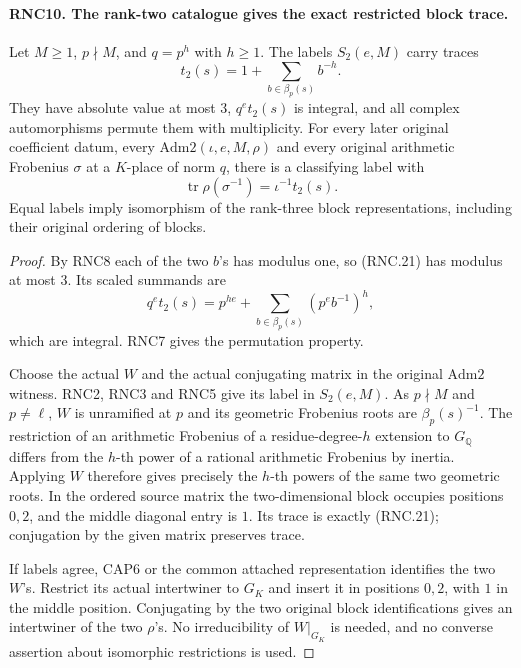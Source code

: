 \paragraph{RNC10. The rank-two catalogue gives the exact restricted block trace.}
\label{claim:RNC10}
Let $M\geq1$, $p\nmid M$, and $q=p^h$ with $h\geq1$.
The labels $S_2(e,M)$ carry traces
\[
                  t_2(s)=1+\sum_{b\in\beta_p(s)}b^{-h}.
                                                               \tag{RNC.21}
\]
They have absolute value at most $3$, $q^e t_2(s)$ is
integral, and all complex automorphisms permute them with
multiplicity.  For every later original coefficient datum,
every $\mathrm{Adm2}(\iota,e,M,\rho)$ and every original
arithmetic Frobenius $\sigma$ at a $K$-place of norm $q$,
there is a classifying label with
\[
         \operatorname{tr}\rho(\sigma^{-1})=\iota^{-1}t_2(s).
                                                               \tag{RNC.22}
\]
Equal labels imply isomorphism of the rank-three block
representations, including their original ordering of blocks.
\begin{proof}
By RNC8 each of the two $b$'s has modulus one, so (RNC.21)
has modulus at most $3$.  Its scaled summands are
\[
 q^e t_2(s)=p^{he}+\sum_{b\in\beta_p(s)}(p^e b^{-1})^h,
                                                               \tag{RNC.23}
\]
which are integral.  RNC7 gives the permutation property.

Choose the actual $W$ and the actual conjugating matrix in
the original $\mathrm{Adm2}$ witness.  RNC2, RNC3 and RNC5
give its label in $S_2(e,M)$.  As $p\nmid M$ and
$p\ne\ell$, $W$ is unramified at $p$ and its geometric
Frobenius roots are $\beta_p(s)^{-1}$.  The restriction of
an arithmetic Frobenius of a residue-degree-$h$ extension
to $G_{\mathbb Q}$ differs from the $h$-th power of a
rational arithmetic Frobenius by inertia.  Applying $W$
therefore gives precisely the $h$-th powers of the same
two geometric roots.  In the ordered source matrix the
two-dimensional block occupies positions $0,2$, and the
middle diagonal entry is $1$.  Its trace is exactly
(RNC.21); conjugation by the given matrix preserves trace.

If labels agree, CAP6 or the common attached representation
identifies the two $W$'s.  Restrict its actual intertwiner
to $G_K$ and insert it in positions $0,2$, with $1$ in the
middle position.  Conjugating by the two original block
identifications gives an intertwiner of the two $\rho$'s.
No irreducibility of $W|_{G_K}$ is needed, and no converse
assertion about isomorphic restrictions is used.
\end{proof}

